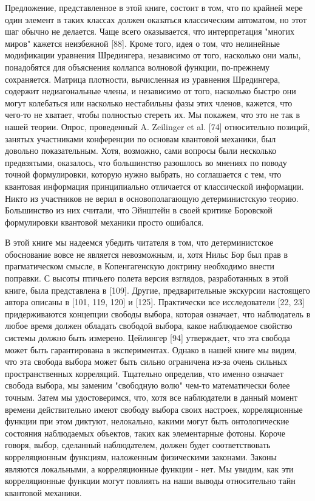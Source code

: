 \documentclass[main.tex]{subfiles}
\begin{document}
Предложение, представленное в этой книге, состоит в том, что по крайней мере один элемент в таких классах должен оказаться классическим автоматом, но этот шаг обычно не делается. Чаще всего оказывается, что интерпретация "многих миров" кажется неизбежной [88]. Кроме того, идея о том, что нелинейные модификации уравнения Шредингера, независимо от того, насколько они малы, понадобятся для объяснения коллапса волновой функции, по-прежнему сохраняется. Матрица плотности, вычисленная из уравнения Шредингера, содержит недиагональные члены, и независимо от того, насколько быстро они могут колебаться или насколько нестабильны фазы этих членов, кажется, что чего-то не хватает, чтобы полностью стереть их. Мы покажем, что это не так в нашей теории. Опрос, проведенный A. Zeilinger et al. [74] относительно позиций, занятых участниками конференции по основам квантовой механики, был довольно показательным. Хотя, возможно, сами вопросы были несколько предвзятыми, оказалось, что большинство разошлось во мнениях по поводу точной формулировки, которую нужно выбрать, но соглашается с тем, что квантовая информация принципиально отличается от классической информации. Никто из участников не верил в основополагающую детерминистскую теорию. Большинство из них считали, что Эйнштейн в своей критике Боровской формулировки квантовой механики просто ошибался. 

В этой книге мы надеемся убедить читателя в том, что детерминистское обоснование вовсе не является невозможным, и, хотя Нильс Бор был прав в прагматическом смысле, в Копенгагенскую доктрину необходимо внести поправки. С высоты птичьего полета версия взглядов, разработанных в этой книге, была представлена в [109]. Другие, предварительные экскурсии настоящего автора описаны в [101, 119, 120] и [125]. Практически все исследователи [22, 23] придерживаются концепции свободы выбора, которая означает, что наблюдатель в любое время должен обладать свободой выбора, какое наблюдаемое свойство системы должно быть измерено. Цейлингер [94] утверждает, что эта свобода может быть гарантирована в экспериментах. Однако в нашей книге мы видим, что эта свобода выбора может быть сильно ограничена из-за очень сильных пространственных корреляций. Тщательно определив, что именно означает свобода выбора, мы заменим "свободную волю" чем-то математически более точным. Затем мы удостоверимся, что, хотя все наблюдатели в данный момент времени действительно имеют свободу выбора своих настроек, корреляционные функции при этом диктуют, нелокально, какими могут быть онтологические состояния наблюдаемых объектов, таких как элементарные фотоны. Короче говоря, выбор, сделанный наблюдателем, должен будет соответствовать корреляционным функциям, наложенным физическими законами. Законы являются локальными, а корреляционные функции - нет. Мы увидим, как эти корреляционные функции могут повлиять на наши выводы относительно тайн квантовой механики.  
\end{document}
